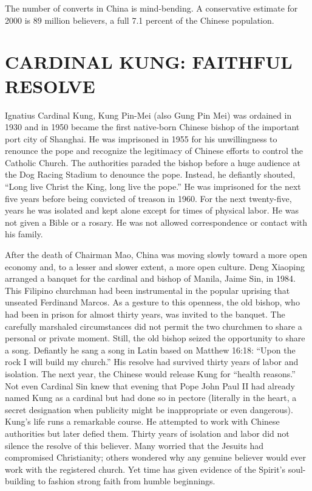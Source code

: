 The number of converts in China is mind-bending. A conservative estimate for 2000 is 89 million
believers, a full 7.1 percent of the Chinese population.

\section{CARDINAL KUNG: FAITHFUL RESOLVE}

Ignatius Cardinal Kung, Kung Pin-Mei (also Gung Pin Mei) was ordained in 1930 and in 1950 became the
first native-born Chinese bishop of the important port city of Shanghai. He was imprisoned in 1955
for his unwillingness to renounce the pope and recognize the legitimacy of Chinese efforts to
control the Catholic Church. The authorities paraded the bishop before a huge audience at the Dog
Racing Stadium to denounce the pope. Instead, he defiantly shouted, “Long live Christ the King, long
live the pope.” He was imprisoned for the next five years before being convicted of treason in 1960.
For the next twenty-five, years he was isolated and kept alone except for times of physical labor.
He was not given a Bible or a rosary. He was not allowed correspondence or contact with his family.

After the death of Chairman Mao, China was moving slowly toward a more open economy and, to a lesser
and slower extent, a more open culture. Deng Xiaoping arranged a banquet for the cardinal and bishop
of Manila, Jaime Sin, in 1984. This Filipino churchman had been instrumental in the popular uprising
that unseated Ferdinand Marcos. As a gesture to this openness, the old bishop, who had been in
prison for almost thirty years, was invited to the banquet. The carefully marshaled circumstances
did not permit the two churchmen to share a personal or private moment. Still, the old bishop seized
the opportunity to share a song. Defiantly he sang a song in Latin based on Matthew 16:18: “Upon the
rock I will build my church.” His resolve had survived thirty years of labor and isolation. The next
year, the Chinese would release Kung for “health reasons.” Not even Cardinal Sin knew that evening
that Pope John Paul II had already named Kung as a cardinal but had done so in pectore (literally in
the heart, a secret designation when publicity might be inappropriate or even dangerous). Kung’s
life runs a remarkable course. He attempted to work with Chinese authorities but later defied them.
Thirty years of isolation and labor did not silence the resolve of this believer. Many worried that
the Jesuits had compromised Christianity; others wondered why any genuine believer would ever work
with the registered church. Yet time has given evidence of the Spirit’s soul-building to fashion
strong faith from humble beginnings.

